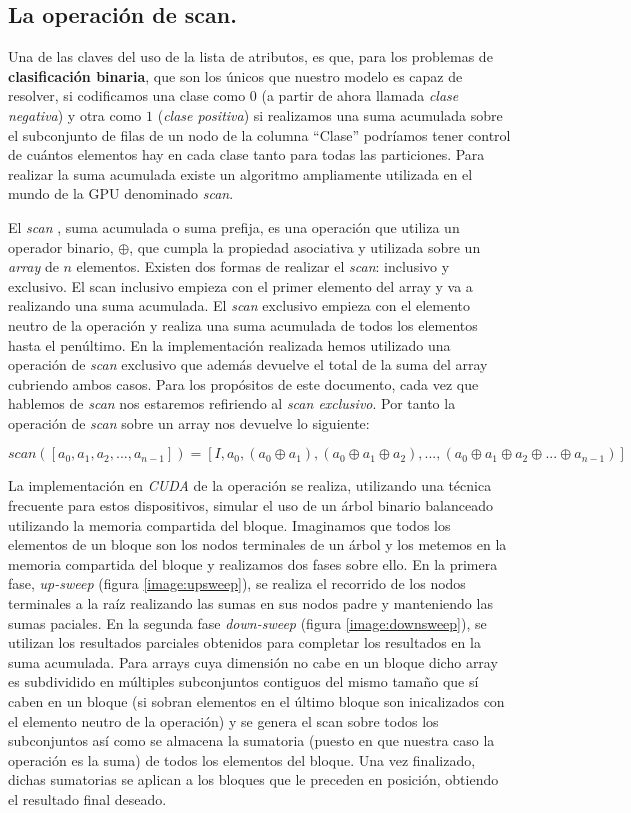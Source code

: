 \subsection{La operación de scan.}
Una de las claves del uso de la lista de atributos, es que, para los problemas de \textbf{clasificación binaria}, que son los únicos que nuestro modelo es capaz de resolver, si codificamos una clase como $0$ (a partir de ahora llamada \textit{clase negativa}) y otra como $1$ (\textit{clase positiva}) si realizamos una suma acumulada sobre el subconjunto de filas de un nodo de la columna ``Clase'' podríamos tener control de cuántos elementos hay en cada clase tanto para todas las particiones. Para realizar la suma acumulada existe un algoritmo ampliamente utilizada en el mundo de la GPU denominado \textit{scan}.

El \textit{scan} \cite{scan}, suma acumulada o suma prefija, es una operación que utiliza un operador binario, $\oplus$, que cumpla la propiedad asociativa y utilizada sobre un \textit{array} de $n$ elementos. Existen dos formas de realizar el \textit{scan}: inclusivo y exclusivo. El scan inclusivo empieza con el primer elemento del array y va a realizando una suma acumulada. El \textit{scan} exclusivo empieza con el elemento neutro de la operación y realiza una suma acumulada de todos los elementos hasta el penúltimo. En la implementación realizada hemos utilizado una operación de \textit{scan} exclusivo que además devuelve el total de la suma del array cubriendo ambos casos. Para los propósitos de este documento, cada vez que hablemos de \textit{scan} nos estaremos refiriendo al \textit{scan exclusivo}. Por tanto la operación de \textit{scan} sobre un array nos devuelve lo siguiente:

$$scan([a_0, a_1, a_2, ..., a_{n-1}]) = [I, a_0, (a_0 \oplus a_1), (a_0 \oplus a_1 \oplus a_2), ..., (a_0 \oplus a_1 \oplus a_2 \oplus ... \oplus a_{n-1})]$$

La implementación en \textit{CUDA} de la operación se realiza, utilizando una técnica frecuente para estos dispositivos, simular el uso de un árbol binario balanceado utilizando la memoria compartida del bloque. Imaginamos que todos los elementos de un bloque son los nodos terminales de un árbol y los metemos en la memoria compartida del bloque y realizamos dos fases sobre ello. En la primera fase, \textit{up-sweep} (figura \ref{image:upsweep}), se realiza el recorrido de los nodos terminales a la raíz realizando las sumas en sus nodos padre y manteniendo las sumas paciales. En la segunda fase \textit{down-sweep} (figura \ref{image:downsweep}), se utilizan los resultados parciales obtenidos para completar los resultados en la suma acumulada. Para arrays cuya dimensión no cabe en un bloque dicho array es subdividido en múltiples subconjuntos contiguos del mismo tamaño que sí caben en un bloque (si sobran elementos en el último bloque son inicalizados con el elemento neutro de la operación) y se genera el scan sobre todos los subconjuntos así como se almacena la sumatoria (puesto en que nuestra caso la operación es la suma) de todos los elementos del bloque. Una vez finalizado, dichas sumatorias se aplican a los bloques que le preceden en posición, obtiendo el resultado final deseado.


